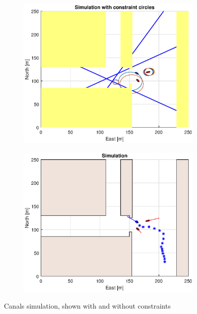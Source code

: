 \begin{figure}[ht]
    \hfill
    \\
    \begin{subfigure}[b]{0.49\textwidth}
        \centering
        \includegraphics[width=\textwidth]{Images/Figures/Havn1/Simple0_f1_Frame5}
    \end{subfigure}
    \hfill
    \begin{subfigure}[b]{0.499\textwidth}
        \centering
        \includegraphics[width=\textwidth]{Images/Figures/Havn1/Simple0_f600_Frame5}
    \end{subfigure}
    \hfill
    \caption{Canals simulation, shown with and without constraints}
\end{figure}

